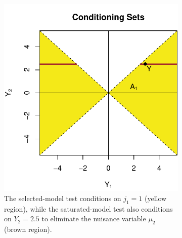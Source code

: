 \documentclass{article}
\begin{document}
\begin{figure}
  \centering
  \begin{subfigure}[t]{.4\textwidth}
    \includegraphics[width=\textwidth]{figs/bivariateSelVSat_condSets.pdf}
    \caption{The selected-model test conditions on $j_1=1$ (yellow region), while the saturated-model test also conditions on $Y_2=2.5$ to eliminate the nuisance variable $\mu_2$ (brown region).}
    \label{fig:bv_condSets}
  \end{subfigure}
  \hspace{.1\textwidth}
  \begin{subfigure}[t]{.4\textwidth}

\end{subfigure}
\end{figure}
\end{document}

